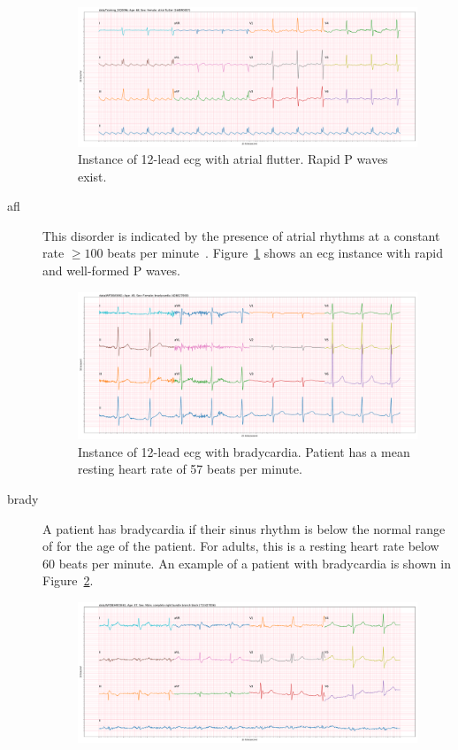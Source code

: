 \documentclass[\main/thesis.tex]{subfiles}
\begin{document}
\begin{description}
    \begin{figure}[ht]
        \centering
        \includegraphics[width=14cm]{figure/AFL/full_0_93.pdf}
        \caption{Instance of 12-lead \gls{ecg} with atrial flutter. Rapid P waves exist.}
        \label{fig:full_AFL}
    \end{figure}
    \item[\gls{afl}] This disorder is indicated by the presence of atrial rhythms at a constant rate $\geq 100$ beats per minute~\cite{saoudi_classification_2001}. Figure~\ref{fig:full_AFL} shows an \gls{ecg} instance with rapid and well-formed P waves.
    \begin{figure}
        \centering
        \includegraphics[width=14cm]{figure/Brady/full_0_42568.pdf}
        \caption{Instance of 12-lead \gls{ecg} with bradycardia. Patient has a mean resting heart rate of 57 beats per minute.}
        \label{fig:full_Brady}
    \end{figure} 
    \item[\gls{brady}] A patient has bradycardia if their sinus rhythm is below the normal range of for the age of the patient. For adults, this is a resting heart rate below 60 beats per minute. An example of a patient with bradycardia is shown in Figure~\ref{fig:full_Brady}.
    \begin{figure}
        \centering
        \includegraphics[width=14cm]{figure/CRBBB/full_2_24132.pdf}

\end{figure}
\end{description}
\end{document}
